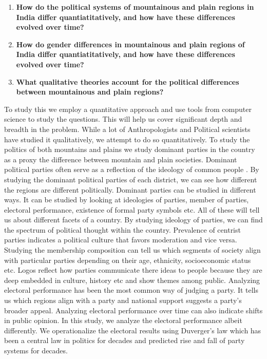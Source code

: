 \begin{sloppypar}
\begin{enumerate}
    \item \textbf{How do the political systems of mountainous and plain regions in India differ quantiatitatively, and how have these differences evolved over time? }
    \item \textbf{How do gender differences in mountainous and plain regions of India differ quantiatitatively, and how have these differences evolved over time?}
    \item \textbf{What qualitative theories account for the political differences between mountainous and plain regions?}
\end{enumerate}

To study this we employ a quantitative approach and use tools from computer science to study the questions. This will help us cover significant depth and breadth in the problem. While a lot of Anthropologists and Political scientists have studied it qualitatively, we attempt to do so quantitatively. To study the politics of both mountains and plains we study dominant parties in the country as a proxy  the difference between mountain and plain societies. Dominant political parties often serve as a reflection of the ideology of common people \citep{romeijn2020political}. By studying the dominant political parties of each district, we can see how different the regions are different politically. Dominant parties can be studied in different ways. It can be studied by looking at ideologies of parties, member of parties, electoral performance, existence of formal party symbols etc. All of these will tell us about different facets of a country. By studying ideology of parties, we can find the spectrum of political thought within the country. Prevalence of centrist parties indicates a political culture that favors moderation and vice versa. Studying the membership composition can tell us  which segments of society align with particular parties depending on their age, ethnicity, socioeconomic status etc. Logos reflect how parties communicate there ideas to people because they are deep embedded in culture, history etc and show themes among public. Analyzing electoral performance has been the most common way of judging a party. It tells us which regions align with a party and national support suggests a party's broader appeal. Analyzing electoral performance over time can also indicate shifts in public opinion. In this study, we analyze the electoral performance albeit differently. We operationalize the electoral results using Duverger's law which has been a central law in politics for decades and predicted rise and fall of party systems for decades. 


\end{sloppypar}
